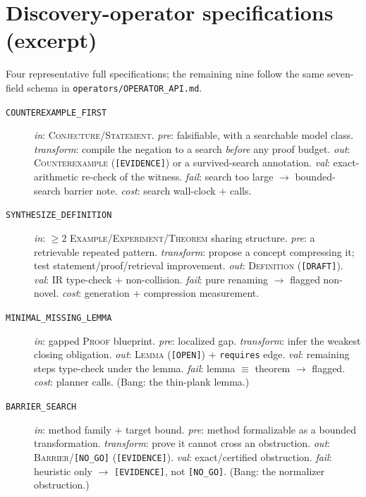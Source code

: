 \documentclass[11pt]{amsart}
\theoremstyle{definition}
\theoremstyle{remark}
\newcommand{\state}[1]{\texttt{[#1]}}
\newcommand{\otype}[1]{\textsc{#1}}
\newcommand{\op}[1]{\texttt{#1}}
\begin{document}
\appendix

\section{Discovery-operator specifications (excerpt)}\label{app:ops}
Four representative full specifications; the remaining nine follow the same
seven-field schema in \texttt{operators/OPERATOR\_API.md}.

\begin{description}
\item[\op{COUNTEREXAMPLE\_FIRST}] \emph{in}: \otype{Conjecture}/\otype{Statement}.
\emph{pre}: falsifiable, with a searchable model class. \emph{transform}: compile
the negation to a search \emph{before} any proof budget. \emph{out}:
\otype{Counterexample} (\state{EVIDENCE}) or a survived-search annotation.
\emph{val}: exact-arithmetic re-check of the witness. \emph{fail}: search too
large $\to$ bounded-search barrier note. \emph{cost}: search wall-clock $+$ calls.
\item[\op{SYNTHESIZE\_DEFINITION}] \emph{in}: $\ge 2$
\otype{Example}/\otype{Experiment}/\otype{Theorem} sharing structure.
\emph{pre}: a retrievable repeated pattern. \emph{transform}: propose a concept
compressing it; test statement/proof/retrieval improvement. \emph{out}:
\otype{Definition} (\state{DRAFT}). \emph{val}: IR type-check $+$ non-collision.
\emph{fail}: pure renaming $\to$ flagged non-novel. \emph{cost}: generation $+$
compression measurement.
\item[\op{MINIMAL\_MISSING\_LEMMA}] \emph{in}: gapped \otype{Proof} blueprint.
\emph{pre}: localized gap. \emph{transform}: infer the weakest closing
obligation. \emph{out}: \otype{Lemma} (\state{OPEN}) $+$ \texttt{requires} edge.
\emph{val}: remaining steps type-check under the lemma. \emph{fail}: lemma
$\equiv$ theorem $\to$ flagged. \emph{cost}: planner calls. (Bang: the thin-plank
lemma.)
\item[\op{BARRIER\_SEARCH}] \emph{in}: method family $+$ target bound. \emph{pre}:
method formalizable as a bounded transformation. \emph{transform}: prove it
cannot cross an obstruction. \emph{out}: \otype{Barrier}/\state{NO\_GO}
(\state{EVIDENCE}). \emph{val}: exact/certified obstruction. \emph{fail}:
heuristic only $\to$ \state{EVIDENCE}, not \state{NO\_GO}. (Bang: the normalizer
obstruction.)
\end{description}
\end{document}
